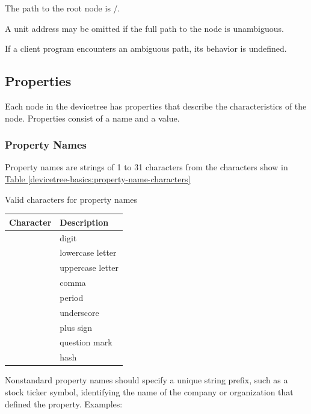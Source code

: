 \documentclass[a4paper,10pt,oneside]{sphinxmanual}
\begin{document}
The path to the root node is /.

A unit address may be omitted if the full path to the node is
unambiguous.

If a client program encounters an ambiguous path, its behavior is
undefined.


\subsection{Properties}
\label{devicetree-basics:properties}
Each node in the devicetree has properties that describe the
characteristics of the node. Properties consist of a name and a value.


\subsubsection{Property Names}
\label{devicetree-basics:property-names}
Property names are strings of 1 to 31 characters from the characters show in
\hyperref[devicetree-basics:property-name-characters]{Table \ref{devicetree-basics:property-name-characters}}


\begin{threeparttable}
\capstart\caption{Valid characters for property names}\label{devicetree-basics:property-name-characters}\label{devicetree-basics:id6}
\begin{tabulary}{\linewidth}{c p{8cm}}
\hline
\textsf{\relax 
Character
} & \textsf{\relax 
Description
}\\
\hline
{}
 & 
digit
\\
\hline
{}
 & 
lowercase letter
\\
\hline
{}
 & 
uppercase letter
\\
\hline
\code{,}
 & 
comma
\\
\hline
{}
 & 
period
\\
\hline
\code{\_}
 & 
underscore
\\
\hline
\code{+}
 & 
plus sign
\\
\hline
{}
 & 
question mark
\\
\hline
\code{\#}
 & 
hash
\\
\hline\end{tabulary}

\end{threeparttable}


Nonstandard property names should specify a unique string prefix, such
as a stock ticker symbol, identifying the name of the company or
organization that defined the property. Examples:
\begin{quote}

\begin{DUlineblock}{0em}
\item[] 
\item[] 
\item[] 
\end{DUlineblock}
\end{quote}
\end{document}
